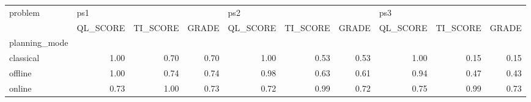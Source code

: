 \begin{tabular}{lrrrrrrrrr}
\toprule
problem & \multicolumn{3}{l}{ps1} & \multicolumn{3}{l}{ps2} & \multicolumn{3}{l}{ps3} \\
{} & QL\_SCORE & TI\_SCORE & GRADE & QL\_SCORE & TI\_SCORE & GRADE & QL\_SCORE & TI\_SCORE & GRADE \\
planning\_mode &          &          &       &          &          &       &          &          &       \\
\midrule
classical     &     1.00 &     0.70 &  0.70 &     1.00 &     0.53 &  0.53 &     1.00 &     0.15 &  0.15 \\
offline       &     1.00 &     0.74 &  0.74 &     0.98 &     0.63 &  0.61 &     0.94 &     0.47 &  0.43 \\
online        &     0.73 &     1.00 &  0.73 &     0.72 &     0.99 &  0.72 &     0.75 &     0.99 &  0.73 \\
\bottomrule
\end{tabular}
